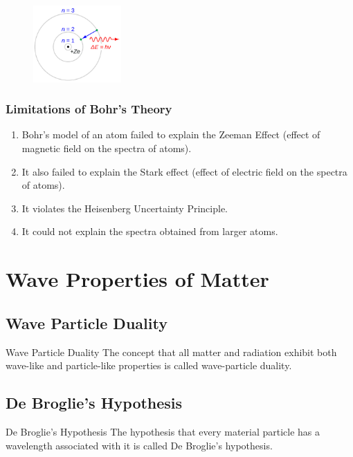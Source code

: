 \documentclass[12pt]{article}
\numberwithin{equation}{subsection}
\begin{document}
\begin{figure}[htpb]
    \centering
    \includegraphics[width=0.3\textwidth]{Bohr's hydrogen.png}
\end{figure}

\subsubsection{Limitations of Bohr's Theory}
\begin{enumerate}
    \item Bohr’s model of an atom failed to explain the Zeeman Effect (effect of magnetic field on the spectra of atoms).
    \item It also failed to explain the Stark effect (effect of electric field on the spectra of atoms).
    \item It violates the Heisenberg Uncertainty Principle.
    \item It could not explain the spectra obtained from larger atoms.
\end{enumerate}



\section{Wave Properties of Matter}
\subsection{Wave Particle Duality}
\begin{definition}{Wave Particle Duality}{}
    The concept that all matter and radiation exhibit both wave-like and particle-like properties is called wave-particle duality.
\end{definition}

\subsection{De Broglie's Hypothesis}
\begin{definition}{De Broglie's Hypothesis}{}
    The hypothesis that every material particle has a wavelength associated with it is called De Broglie's hypothesis.
\end{definition}
\end{document}
